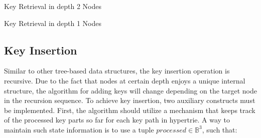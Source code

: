 \begin{algorithm}
	\DontPrintSemicolon
	\SetAlgoLined
	 \;
	\caption{\sc Key Retrieval in depth 2 Nodes}
	\label{algo:key_retrieval_depth2}
	
\end{algorithm}

\begin{algorithm}
	\DontPrintSemicolon
	\SetAlgoLined
	 \;
	\caption{\sc Key Retrieval in depth 1 Nodes}
	\label{algo:key_retrieval_depth1}
	
\end{algorithm}

\clearpage

\subsection{Key Insertion} 
Similar to other tree-based data structures, the key insertion operation is recursive. Due to the fact that nodes at certain depth enjoys a unique  internal structure, the algorithm for adding keys will change depending on the target node in the recursion sequence. To achieve key insertion, two auxiliary constructs must be implemented. First, the algorithm should utilize a mechanism that keeps track of the processed key parts so far for each key path in hypertrie. A way to maintain such state information is to use a tuple $processed \in \mathbb{B}^3$, such that:\\

